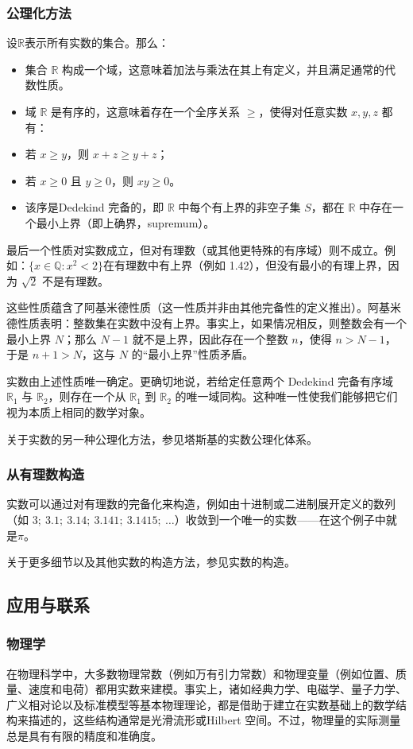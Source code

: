 \subsubsection{公理化方法}
设$\mathbb{R}$表示所有实数的集合。那么：
\begin{itemize}
\item 集合 $\mathbb{R}$ 构成一个域，这意味着加法与乘法在其上有定义，并且满足通常的代数性质。
\item 域 $\mathbb{R}$ 是有序的，这意味着存在一个全序关系 $\geq$，使得对任意实数 $x, y, z$ 都有：
\item 若 $x \geq y$，则 $x+z \geq y+z$；
\item 若 $x \geq 0$ 且 $y \geq 0$，则 $xy \geq 0$。
\item 该序是Dedekind 完备的，即 $\mathbb{R}$ 中每个有上界的非空子集 $S$，都在 $\mathbb{R}$ 中存在一个最小上界（即上确界，supremum）。
\end{itemize}
最后一个性质对实数成立，但对有理数（或其他更特殊的有序域）则不成立。例如：$\{x \in \mathbb{Q} : x^{2} < 2\}$在有理数中有上界（例如 1.42），但没有最小的有理上界，因为 $\sqrt{2}$ 不是有理数。

这些性质蕴含了阿基米德性质（这一性质并非由其他完备性的定义推出）。阿基米德性质表明：整数集在实数中没有上界。事实上，如果情况相反，则整数会有一个最小上界 $N$；那么 $N-1$ 就不是上界，因此存在一个整数 $n$，使得 $n > N-1$，于是 $n+1 > N$，这与 $N$ 的“最小上界”性质矛盾。

实数由上述性质唯一确定。更确切地说，若给定任意两个 Dedekind 完备有序域 $\mathbb{R}_{1}$ 与 $\mathbb{R}_{2}$，则存在一个从 $\mathbb{R}_{1}$ 到 $\mathbb{R}_{2}$ 的唯一域同构。这种唯一性使我们能够把它们视为本质上相同的数学对象。

关于实数的另一种公理化方法，参见塔斯基的实数公理化体系。
\subsubsection{从有理数构造}
实数可以通过对有理数的完备化来构造，例如由十进制或二进制展开定义的数列（如 $3;\ 3.1;\ 3.14;\ 3.141;\ 3.1415;\ \ldots$）收敛到一个唯一的实数——在这个例子中就是$\pi$。

关于更多细节以及其他实数的构造方法，参见实数的构造。
\subsection{应用与联系}
\subsubsection{物理学}
在物理科学中，大多数物理常数（例如万有引力常数）和物理变量（例如位置、质量、速度和电荷）都用实数来建模。事实上，诸如经典力学、电磁学、量子力学、广义相对论以及标准模型等基本物理理论，都是借助于建立在实数基础上的数学结构来描述的，这些结构通常是光滑流形或Hilbert 空间。不过，物理量的实际测量总是具有有限的精度和准确度。

